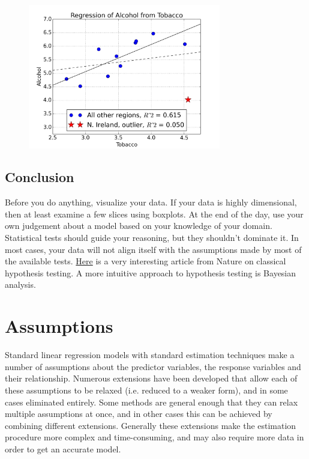 \begin{figure}
  \centering
  \includegraphics[width=0.75\textwidth]{../Images/alcohol_regressed_over_tobacco.png}
\end{figure}

\subsection{Conclusion}

Before you do anything, visualize your data. If your data is highly dimensional, then at least examine a few slices using boxplots. At the end of the day, use your own judgement about a model based on your knowledge of your domain. Statistical tests should guide your reasoning, but they shouldn’t dominate it. In most cases, your data will not align itself with the assumptions made by most of the available tests. \href{http://www.nature.com/news/scientific-method-statistical-errors-1.14700}{Here} is a very interesting article from Nature on classical hypothesis testing. A more intuitive approach to hypothesis testing is Bayesian analysis.

\section{Assumptions} \label{sec:Assumptions}

Standard linear regression models with standard estimation techniques make a number of assumptions about the predictor variables, the response variables and their relationship.  Numerous extensions have been developed that allow each of these assumptions to be relaxed (i.e. reduced to a weaker form), and in some cases eliminated entirely.  Some methods are general enough that they can relax multiple assumptions at once, and in other cases this can be achieved by combining different extensions.  Generally these extensions make the estimation procedure more complex and time-consuming, and may also require more data in order to get an accurate model.

